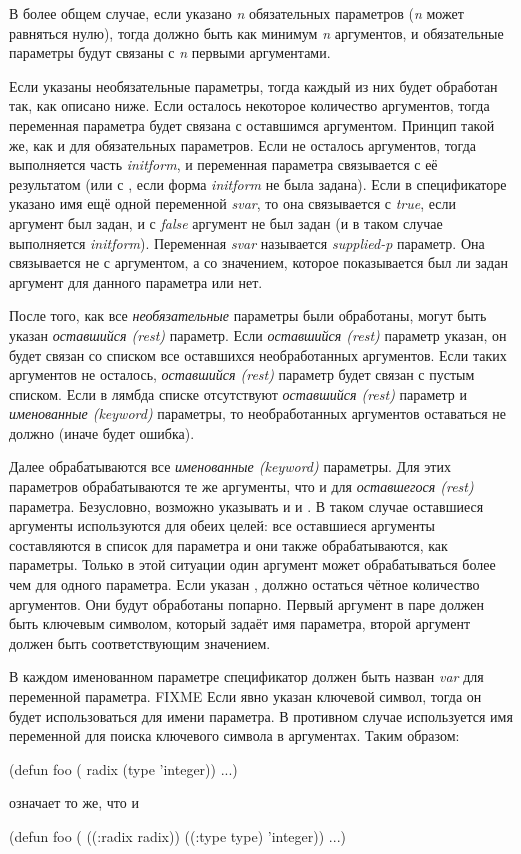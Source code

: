 В более общем случае, если указано \emph{n} обязательных параметров
(\emph{n} может равняться нулю), тогда должно быть как минимум \emph{n}
аргументов, и обязательные параметры будут связаны с \emph{n} первыми
аргументами.

Если указаны необязательные параметры, тогда каждый из них будет обработан так,
как описано ниже. Если осталось некоторое количество аргументов, тогда
переменная параметра  будет связана с оставшимся аргументом. Принцип
такой же, как и для обязательных параметров. Если не осталось аргументов, тогда
выполняется часть \emph{initform}, и переменная
параметра связывается с её результатом (или с {\false}, если форма
\emph{initform} не была задана).
Если в спецификаторе указано имя ещё одной переменной \emph{svar}, то она
связывается с \emph{true}, если аргумент был задан, и с \emph{false}
аргумент не был задан (и в таком случае выполняется \emph{initform}).
Переменная \emph{svar} называется \emph{supplied-p} параметр. Она
связывается не с аргументом, а со значением, которое показывается был ли задан
аргумент для данного параметра или нет.

После того, как все \emph{необязательные} параметры были обработаны, могут
быть указан \emph{оставшийся (rest)} параметр.
Если \emph{оставшийся (rest)} параметр указан, он будет связан со списком все
оставшихся необработанных аргументов. Если таких аргументов не осталось,
\emph{оставшийся (rest)} параметр будет связан с пустым списком. Если в лямбда
списке отсутствуют \emph{оставшийся (rest)} параметр и \emph{именованные
  (keyword)} параметры, то необработанных аргументов оставаться не должно (иначе
будет ошибка).

Далее обрабатываются все \emph{именованные (keyword)} параметры.
Для этих параметров обрабатываются те же аргументы, что и для
\emph{оставшегося (rest)} параметра.
Безусловно, возможно указывать и  и . В таком случае
оставшиеся аргументы используются для обеих целей:
все оставшиеся аргументы составляются в список для  параметра и они
также обрабатываются, как  параметры. Только в этой ситуации один
аргумент может обрабатываться более чем для одного параметра.
Если указан , должно остаться чётное количество аргументов. Они будут
обработаны попарно. Первый аргумент в паре должен быть ключевым символом,
который задаёт имя параметра, второй аргумент должен быть соответствующим
значением.

В каждом именованном параметре спецификатор должен быть назван \emph{var} для
переменной параметра. FIXME
Если явно указан ключевой символ, тогда он будет использоваться для имени
параметра. В противном случае используется имя переменной  для поиска
ключевого символа в аргументах. Таким образом:
\begin{lisp}
(defun foo ( radix (type 'integer)) ...)
\end{lisp}
означает то же, что и
\begin{lisp}
(defun foo ( ((:radix radix)) ((:type type) 'integer)) ...)
\end{lisp}

